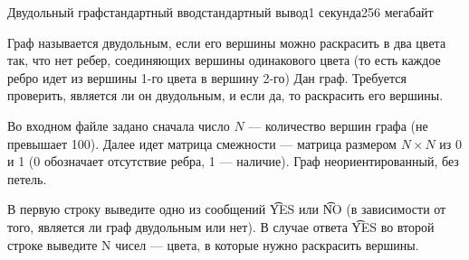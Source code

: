 \begin{problem}{Двудольный граф}{стандартный ввод}{стандартный вывод}{1 секунда}{256 мегабайт}

Граф называется двудольным, если его вершины можно раскрасить в два цвета так, что нет ребер, соединяющих вершины одинакового цвета (то есть каждое ребро идет из вершины 1-го цвета в вершину 2-го) 
Дан граф. Требуется проверить, является ли он двудольным, и если да, то раскрасить его вершины.

\InputFile
Во входном файле задано сначала число $N$ --- количество вершин графа (не превышает 100). Далее идет матрица смежности --- матрица размером $N \times N$ из 0 и 1 (0 обозначает отсутствие ребра, 1 --- наличие). Граф неориентированный, без петель.


\OutputFile
В первую строку выведите одно из сообщений \t{YES} или \t{NO} (в зависимости от того, является ли граф двудольным или нет). В случае ответа \t{YES} во второй строке выведите N чисел --- цвета, в которые нужно раскрасить вершины. 

\Examples

\begin{example}
%
%
\end{example}

\end{problem}

